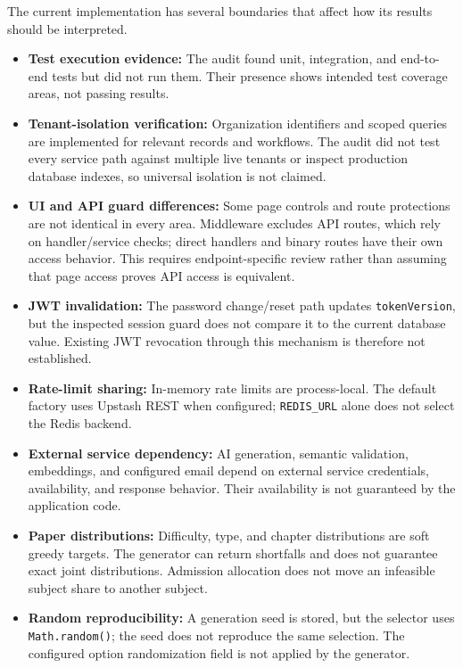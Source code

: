 The current implementation has several boundaries that affect how its results should be interpreted.

\begin{itemize}
    \item \textbf{Test execution evidence:} The audit found unit, integration, and end-to-end tests but did not run them. Their presence shows intended test coverage areas, not passing results.
    \item \textbf{Tenant-isolation verification:} Organization identifiers and scoped queries are implemented for relevant records and workflows. The audit did not test every service path against multiple live tenants or inspect production database indexes, so universal isolation is not claimed.
    \item \textbf{UI and API guard differences:} Some page controls and route protections are not identical in every area. Middleware excludes API routes, which rely on handler/service checks; direct handlers and binary routes have their own access behavior. This requires endpoint-specific review rather than assuming that page access proves API access is equivalent.
    \item \textbf{JWT invalidation:} The password change/reset path updates \texttt{tokenVersion}, but the inspected session guard does not compare it to the current database value. Existing JWT revocation through this mechanism is therefore not established.
    \item \textbf{Rate-limit sharing:} In-memory rate limits are process-local. The default factory uses Upstash REST when configured; \texttt{REDIS\_URL} alone does not select the Redis backend.
    \item \textbf{External service dependency:} AI generation, semantic validation, embeddings, and configured email depend on external service credentials, availability, and response behavior. Their availability is not guaranteed by the application code.
    \item \textbf{Paper distributions:} Difficulty, type, and chapter distributions are soft greedy targets. The generator can return shortfalls and does not guarantee exact joint distributions. Admission allocation does not move an infeasible subject share to another subject.
    \item \textbf{Random reproducibility:} A generation seed is stored, but the selector uses \texttt{Math.random()}; the seed does not reproduce the same selection. The configured option randomization field is not applied by the generator.

\end{itemize}
